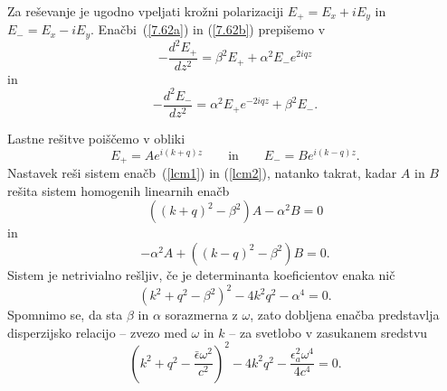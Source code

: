 Za reševanje je ugodno vpeljati krožni polarizaciji 
$E_{+}=E_{x}+iE_{y}$ in $E_{-}=E_{x}-iE_{y}$.
Enačbi~(\ref{7.62a}) in (\ref{7.62b}) prepišemo v
\begin{equation}
-\frac{d^{2}E_{+}}{dz^{2}}=\beta^{2}E_{+}+\alpha^{2}E_{-}e^{2iqz}
\label{lcm1}
\end{equation}
in 
\begin{equation}
-\frac{d^{2}E_{-}}{dz^{2}}=\alpha^{2}E_{+}e^{-2iqz}+\beta^{2}E_{-}.
\label{lcm2}
\end{equation}

Lastne rešitve poiščemo v obliki 
\begin{equation}
E_{+}  =  Ae^{i(k+q)z} 
\qquad
\mathrm{in}
\qquad
E_{-}  =  Be^{i(k-q)z}.
\label{7.65}
\end{equation}
Nastavek reši sistem enačb~(\ref{lcm1}) in (\ref{lcm2}), 
natanko takrat, kadar $A$ in $B$ rešita sistem homogenih linearnih enačb 
\begin{equation}
\left((k+q)^{2}-\beta^{2}\right)A-\alpha^{2}B  =  0 
\label{7.66c}
\end{equation}
in
\begin{equation}
-\alpha^{2}A+\left((k-q)^{2}-\beta^{2}\right)B  =  0.
\label{7.66d}
\end{equation}
 Sistem je netrivialno rešljiv, če je determinanta koeficientov enaka
nič
\begin{equation}
\left(k^{2}+q^{2}-\beta^{2}\right)^{2}-4k^{2}q^{2}-\alpha^{4}=0.
\label{7.66}
\end{equation}
Spomnimo se, da sta $\beta$ in $\alpha$ sorazmerna z $\omega$,
zato dobljena enačba predstavlja disperzijsko relacijo -- zvezo med 
$\omega$ in $k$ -- za svetlobo v zasukanem sredstvu
\begin{equation}
\left(k^{2}+q^{2}-\frac{\bar{\epsilon}\omega^{2}}{c^{2}}\right)^{2}-
4k^{2}q^{2}- \frac{\epsilon_{a}^2\omega^{4}}{4c^{4}}
=0.
\label{7.66a}
\end{equation}

